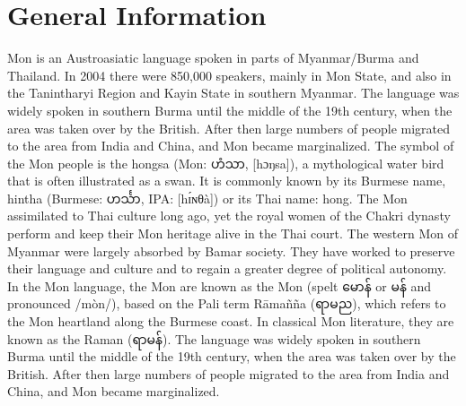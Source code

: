 \documentclass[conference]{IEEEtran}
\begin{document}
\section{General Information}
Mon is an Austroasiatic language spoken in parts of Myanmar/Burma and Thailand. In 2004 there were 850,000 speakers, mainly in Mon State, and also in the Tanintharyi Region and Kayin State in southern Myanmar. The language was widely spoken in southern Burma until the middle of the 19th century, when the area was taken over by the British. After then large numbers of people migrated to the area from India and China, and Mon became marginalized. The symbol of the Mon people is the hongsa (Mon: {\padauktext ဟံသာ}, [hɔŋsa]), a mythological water bird that is often illustrated as a swan. It is commonly known by its Burmese name, hintha (Burmese: {\padauktext ဟင်္သာ}, IPA: [hɪ́ɴθà]) or its Thai name: hong. \cite{b1} The Mon assimilated to Thai culture long ago, yet the royal women of the Chakri dynasty perform and keep their Mon heritage alive in the Thai court. The western Mon of Myanmar were largely absorbed by Bamar society. They have worked to preserve their language and culture and to regain a greater degree of political autonomy. In the Mon language, the Mon are known as the Mon (spelt {\padauktext မောန်} or {\padauktext မန်} and pronounced /mòn/), based on the Pali term Rāmañña ({\padauktext ရာမည}), which refers to the Mon heartland along the Burmese coast. In classical Mon literature, they are known as the Raman ({\padauktext ရာမန်}). The language was widely spoken in southern Burma until the middle of the 19th century, when the area was taken over by the British. After then large numbers of people migrated to the area from India and China, and Mon became marginalized.
\end{document}

